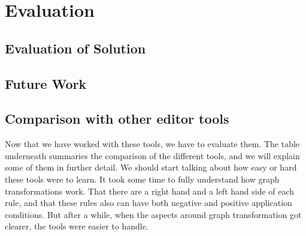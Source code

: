 
\chapter{Evaluation} %

\label{Chapter7} %



\section{Evaluation of Solution}

\section{Future Work}


\section{Comparison with other editor tools}

Now that we have worked with these tools, we have to evaluate them.
The table underneath summaries the comparison of the different tools, and we
will explain some of them in further detail. We should start talking about how
easy or hard these tools were to learn. It took some time to fully understand
how graph transformations work. That there are a right hand and a left hand
side of each rule, and that these rules also can have both negative and
positive application conditions. But after a while, when the aspects around
graph transformation got clearer, the tools were easier to handle. 

